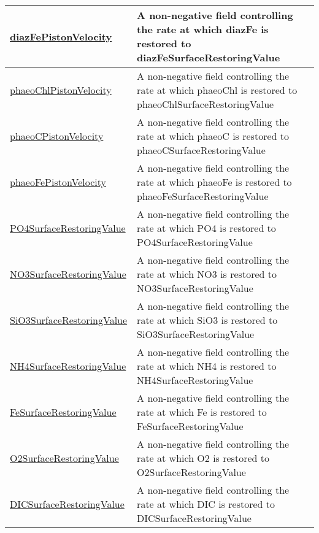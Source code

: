 {\begin{center}
\begin{longtable}{| p{2.0in} | p{4.0in} |}
    \hyperref[subsec:var_sec_forcing_diazFePistonVelocity]{diazFePistonVelocity} & A non-negative field controlling the rate at which diazFe is restored to diazFeSurfaceRestoringValue \\
    \hline
    \hyperref[subsec:var_sec_forcing_phaeoChlPistonVelocity]{phaeoChlPistonVelocity} & A non-negative field controlling the rate at which phaeoChl is restored to phaeoChlSurfaceRestoringValue \\
    \hline
    \hyperref[subsec:var_sec_forcing_phaeoCPistonVelocity]{phaeoCPistonVelocity} & A non-negative field controlling the rate at which phaeoC is restored to phaeoCSurfaceRestoringValue \\
    \hline
    \hyperref[subsec:var_sec_forcing_phaeoFePistonVelocity]{phaeoFePistonVelocity} & A non-negative field controlling the rate at which phaeoFe is restored to phaeoFeSurfaceRestoringValue \\
    \hline
    \hyperref[subsec:var_sec_forcing_PO4SurfaceRestoringValue]{PO4SurfaceRestoringValue} & A non-negative field controlling the rate at which PO4 is restored to PO4SurfaceRestoringValue \\
    \hline
    \hyperref[subsec:var_sec_forcing_NO3SurfaceRestoringValue]{NO3SurfaceRestoringValue} & A non-negative field controlling the rate at which NO3 is restored to NO3SurfaceRestoringValue \\
    \hline
    \hyperref[subsec:var_sec_forcing_SiO3SurfaceRestoringValue]{SiO3SurfaceRestoringValue} & A non-negative field controlling the rate at which SiO3 is restored to SiO3SurfaceRestoringValue \\
    \hline
    \hyperref[subsec:var_sec_forcing_NH4SurfaceRestoringValue]{NH4SurfaceRestoringValue} & A non-negative field controlling the rate at which NH4 is restored to NH4SurfaceRestoringValue \\
    \hline
    \hyperref[subsec:var_sec_forcing_FeSurfaceRestoringValue]{FeSurfaceRestoringValue} & A non-negative field controlling the rate at which Fe is restored to FeSurfaceRestoringValue \\
    \hline
    \hyperref[subsec:var_sec_forcing_O2SurfaceRestoringValue]{O2SurfaceRestoringValue} & A non-negative field controlling the rate at which O2 is restored to O2SurfaceRestoringValue \\
    \hline
    \hyperref[subsec:var_sec_forcing_DICSurfaceRestoringValue]{DICSurfaceRestoringValue} & A non-negative field controlling the rate at which DIC is restored to DICSurfaceRestoringValue \\

\end{longtable}
\end{center}}
